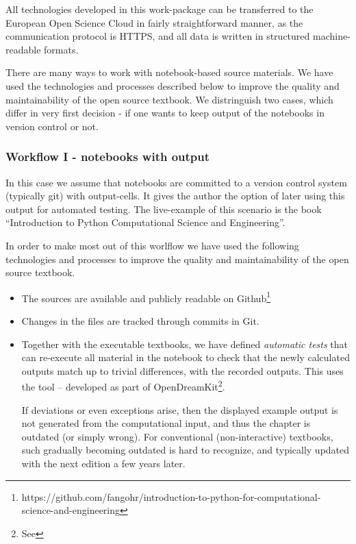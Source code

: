 \documentclass{deliverablereport}
\begin{document}
{{{All technologies developed in this work-package can be transferred to
the European Open Science Cloud in fairly straightforward manner, as
the communication protocol is HTTPS, and all data is written in
structured machine-readable formats.

\bigskip

There are many ways to work with notebook-based source materials.  We
have used the technologies and processes described below to improve
the quality and maintainability of the open source textbook. We
distringuish two cases, which differ in very first decision - if one
wants to keep output of the notebooks in version control or not.

\subsubsection{Workflow I - notebooks with output}

In this case we assume that notebooks are committed to a version
control system (typically git) with output-cells. It gives the author
the option of later using this output for automated testing. The
live-example of this scenario is the book ``Introduction to Python
Computational Science and Engineering''.

In order to make most out of this worlflow we have used the following
technologies and processes to improve the quality and maintainability
of the open source textbook.
\begin{itemize}
\item The sources are available and publicly readable on
  Github\footnote{https://github.com/fangohr/introduction-to-python-for-computational-science-and-engineering}
\item Changes in the files are tracked through commits in Git.
\item Together with the executable textbooks, we have defined
  \emph{automatic tests} that can re-execute all material in the
  notebook to check that the newly calculated outputs match
  up to trivial differences, with the recorded outputs.
  This uses the \nbval tool -- developed as part of
  OpenDreamKit\footnote{ See  }.

  If deviations or even exceptions arise, then the displayed example
  output is not generated from the computational input, and thus the
  chapter is outdated (or simply wrong). For conventional
  (non-interactive) textbooks, such gradually becoming outdated is
  hard to recognize, and typically updated with the next edition a
  few years later.


\end{itemize}}}}
\end{document}
